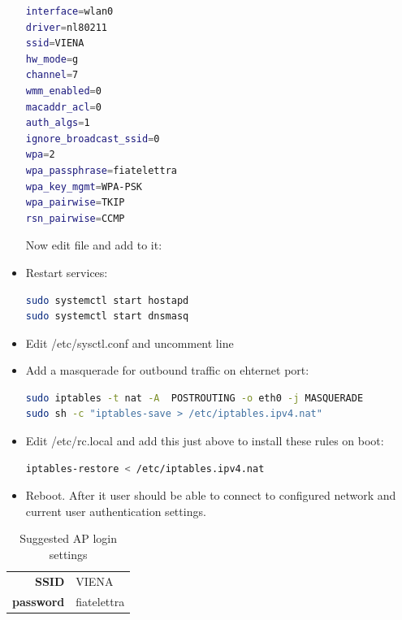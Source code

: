 \begin{itemize}
\begin{lstlisting}[frame=none,language=bash,backgroundcolor=\color{gray!15},numbers=none,		basicstyle=\ttfamily]
interface=wlan0
driver=nl80211
ssid=VIENA
hw_mode=g
channel=7
wmm_enabled=0
macaddr_acl=0
auth_algs=1
ignore_broadcast_ssid=0
wpa=2
wpa_passphrase=fiatelettra
wpa_key_mgmt=WPA-PSK
wpa_pairwise=TKIP
rsn_pairwise=CCMP
\end{lstlisting}
Now edit file  and add to it:\\ 
\item Restart services: 
\begin{lstlisting}[frame=none,language=bash,backgroundcolor=\color{gray!15},numbers=none,		basicstyle=\ttfamily]
sudo systemctl start hostapd
sudo systemctl start dnsmasq
\end{lstlisting}
\item Edit /etc/sysctl.conf and uncomment line 
\item Add a masquerade for outbound traffic on ehternet port:
\begin{lstlisting}[frame=none,language=bash,backgroundcolor=\color{gray!15},numbers=none,		basicstyle=\ttfamily]
sudo iptables -t nat -A  POSTROUTING -o eth0 -j MASQUERADE
sudo sh -c "iptables-save > /etc/iptables.ipv4.nat"
\end{lstlisting}
\item Edit /etc/rc.local and add this just above  to install these rules on boot:
\begin{lstlisting}[frame=none,language=bash,backgroundcolor=\color{gray!15},numbers=none,		basicstyle=\ttfamily]
iptables-restore < /etc/iptables.ipv4.nat
\end{lstlisting}
\item Reboot. After it user should be able to connect to configured network and current user authentication settings.
\end{itemize}

\begin{table}[h]
	\centering
	\begin{tabular}{rl}
		\toprule
		\textbf{SSID} & VIENA\\
		\textbf{password} & fiatelettra\\
		\bottomrule
	\end{tabular}
    \caption{Suggested AP login settings}
    \label{tab:ap_settings}
\end{table}

